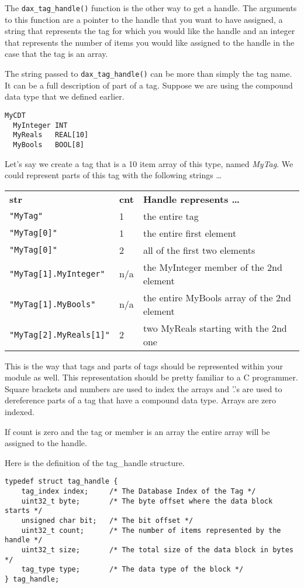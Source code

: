 The \verb|dax_tag_handle()| function  is the other way to get a handle.  The arguments to this function are a pointer to the handle that you want to have assigned, a string that represents the tag for which you would like the handle and an integer that represents the number of items you would like assigned to the handle in the case that the tag is an array.

The string passed to \verb|dax_tag_handle()| can be more than simply the tag name.  It can be a full description of part of a tag.  Suppose we are using the compound data type that we defined earlier.

\begin{verbatim}
MyCDT
  MyInteger INT
  MyReals   REAL[10]
  MyBools   BOOL[8]
\end{verbatim}

Let's say we create a tag that is a 10 item array of this type, named \emph{MyTag}.  We could represent parts of this tag with the following strings \ldots

\begin{tabular}{lll}
\textbf{str} & \textbf{cnt} & \textbf{Handle represents \ldots} \\
\verb|"MyTag"| & 1 & the entire tag \\ 
\verb|"MyTag[0]"| & 1 & the entire first element \\ 
\verb|"MyTag[0]"| & 2 & all of the first two elements \\ 
\verb|"MyTag[1].MyInteger"| & n/a & the MyInteger member of the 2nd element \\ 
\verb|"MyTag[1].MyBools"| & n/a & the entire MyBools array of the 2nd element \\ 
\verb|"MyTag[2].MyReals[1]"| & 2 & two MyReals starting with the 2nd one \\ 
\end{tabular} 

This is the way that tags and parts of tags should be represented within your module as well.  This representation should be pretty familiar to a C programmer.  Square brackets and numbers are used to index the arrays and '.'s are used to dereference parts of a tag that have a compound data type.  Arrays are zero indexed.

If count is zero and the tag or member is an array the entire array will be assigned to the handle.

Here is the definition of the tag\_handle structure.

\begin{verbatim}
typedef struct tag_handle {
	tag_index index;     /* The Database Index of the Tag */
	uint32_t byte;       /* The byte offset where the data block starts */
	unsigned char bit;   /* The bit offset */
	uint32_t count;      /* The number of items represented by the handle */
	uint32_t size;       /* The total size of the data block in bytes */
	tag_type type;       /* The data type of the block */
} tag_handle;
\end{verbatim}


